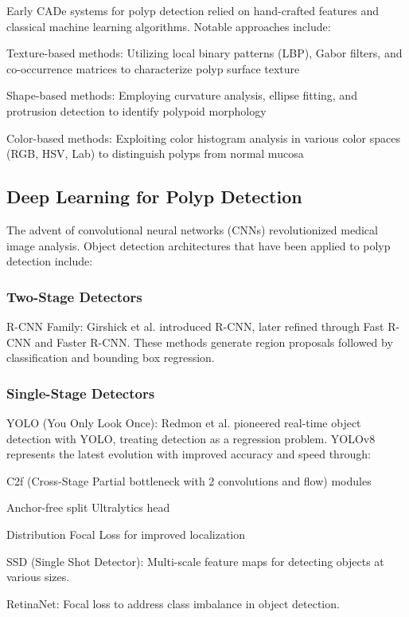 \documentclass[runningheads]{llncs}
\begin{document}
Early CADe systems for polyp detection relied on hand-crafted features and classical machine learning algorithms. Notable approaches include:

\noindent Texture-based methods: Utilizing local binary patterns (LBP), Gabor filters, and co-occurrence matrices to characterize polyp surface texture

\noindent Shape-based methods: Employing curvature analysis, ellipse fitting, and protrusion detection to identify polypoid morphology

\noindent Color-based methods: Exploiting color histogram analysis in various color spaces (RGB, HSV, Lab) to distinguish polyps from normal mucosa

\subsection{Deep Learning for Polyp Detection}

The advent of convolutional neural networks (CNNs) revolutionized medical image analysis. Object detection architectures that have been applied to polyp detection include:

\subsubsection{Two-Stage Detectors}
R-CNN Family: Girshick et al. introduced R-CNN, later refined through Fast R-CNN and Faster R-CNN. These methods generate region proposals followed by classification and bounding box regression.

\subsubsection{Single-Stage Detectors}
YOLO (You Only Look Once): Redmon et al. pioneered real-time object detection with YOLO, treating detection as a regression problem. YOLOv8 represents the latest evolution with improved accuracy and speed through:

\noindent C2f (Cross-Stage Partial bottleneck with 2 convolutions and flow) modules

\noindent Anchor-free split Ultralytics head

\noindent Distribution Focal Loss for improved localization

SSD (Single Shot Detector): Multi-scale feature maps for detecting objects at various sizes.

RetinaNet: Focal loss to address class imbalance in object detection.
\end{document}
